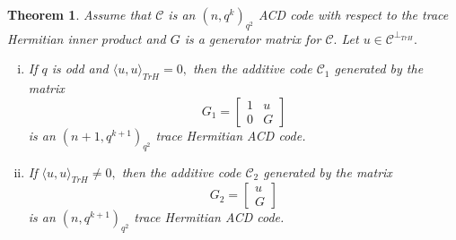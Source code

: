 \documentclass[sn-mathphys-num]{sn-jnl}%
\theoremstyle{thmstyleone}%
\newtheorem{theorem}{Theorem}%
\theoremstyle{thmstyletwo}%
\theoremstyle{thmstylethree}%
\begin{document}
\begin{theorem}\label{conshermitian}
	Assume that $\mathcal{C}$ is an $(n,q^k)_{q^2}$ ACD code  with respect to the trace Hermitian inner product and $G$ is a  generator matrix for $\mathcal{C}.$  Let $u\in \mathcal{C}^{\perp_{TrH}}.$ 
	\begin{enumerate}[(i)]
		\item If $q$ is odd and $\langle u,u\rangle_{TrH}=0,$ then the additive code $\mathcal{C}_1$ generated by the matrix 
		$$G_1=\begin{bmatrix}
			1 & u\\
			0 & G
		\end{bmatrix}$$
		is an $(n+1,q^{k+1})_{q^2}$  trace Hermitian ACD code.
		\item  If $\langle u,u\rangle_{TrH}\neq 0,$ then the additive code $\mathcal{C}_2$ generated by the matrix 
		$$G_2=\begin{bmatrix}
			u\\
			G
		\end{bmatrix}$$
		is an $(n,q^{k+1})_{q^2}$  trace Hermitian ACD code.
		
	\end{enumerate}
\end{theorem}
\end{document}
